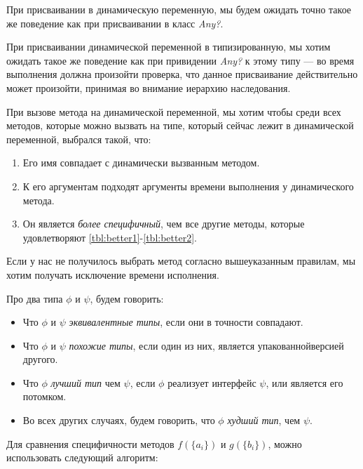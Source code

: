 При присваивании в динамическую переменную, мы будем ожидать точно такое же поведение как при присваивании в класс \textit{Any?}.

При присваивании динамической переменной в типизированную, мы хотим ожидать такое же поведение как при привидении \textit{Any?} к этому типу --- во время выполнения должна произойти проверка, что данное присваивание действительно может произойти, принимая во внимание иерархию наследования.

При вызове метода на динамической переменной, мы хотим чтобы среди всех методов, которые можно вызвать на типе, который сейчас лежит в динамической переменной, выбрался такой, что:
\begin{enumerate}
    \item Его имя совпадает с динамически вызванным методом. \label{tbl:better1}
    \item К его аргументам подходят аргументы времени выполнения у динамического метода. \label{tbl:better2}
    \item Он является \textit{более специфичный}, чем все другие методы, которые удовлетворяют \ref{tbl:better1}-\ref{tbl:better2}.
\end{enumerate}

Если у нас не получилось выбрать метод согласно вышеуказанным правилам, мы хотим получать исключение времени исполнения.

Про два типа $\phi$ и $\psi$, будем говорить:
\begin{itemize}
    \item Что $\phi$ и $\psi$ \textit{эквивалентные типы}, если они в точности совпадают.
    \item Что $\phi$ и $\psi$ \textit{похожие типы}, если один из них, является упакованной\footnotemark версией другого.
    \item Что $\phi$ \textit{лучший тип} чем  $\psi$, если $\phi$ реализует интерфейс $\psi$, или является его потомком.
    \item Во всех других случаях, будем говорить, что $\phi$ \textit{худший тип}, чем $\psi$.
\end{itemize}


Для сравнения специфичности методов $f(\{a_i\})$ и $g(\{b_i\})$, можно использовать следующий алгоритм:

